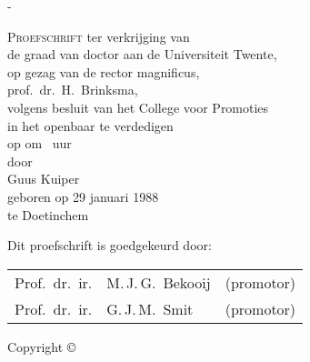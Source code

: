 \thispagestyle{empty}

\calccentering{\unitlength}
\begin{adjustwidth*}{\unitlength}{-\unitlength}
	\begin{center}
		\null\vfill
		{\begin{Spacing}{1.2}\LARGE\scshape\thetitle\end{Spacing}}
		{\ifthenelse{\equal{\thesubtitle}{}}{}{\mbox{} \\[1.5ex]\Large\scshape\thesubtitle}}
		\vfill
		\vfill
		{\scshape Proefschrift}
		\vfill
		ter verkrijging van\\
		de graad van doctor aan de Universiteit Twente,\\
		op gezag van de rector magnificus,\\
		prof.\ dr.\ H.\ Brinksma,\\
		volgens besluit van het College voor Promoties\\
		in het openbaar te verdedigen\\
		op  om \thesistimedutch\ uur\\[3\onelineskip]

		door\\[\onelineskip]
		Guus Kuiper\\[2\onelineskip]
		geboren op 29 januari 1988\\
		te Doetinchem
		\vfill
	\end{center}
\end{adjustwidth*}

\clearpage

\thispagestyle{empty}

\begin{flushleft}
Dit proefschrift is goedgekeurd door:\\
\bigskip
\def\small{\normalsize}%
\begin{tabular}{@{}r@{~~}ll}
Prof.~dr.~ir.\@		& M.\,J.\,G.~Bekooij	& (promotor) \\
Prof.~dr.~ir.\@		& G.\,J.\,M.~Smit		& (promotor) \\
\end{tabular}
\end{flushleft}

\vfill
{
Copyright \copyright\ \thesisyear\ \theauthor \\
 \thesisISBN
}

\cleardoublepage
